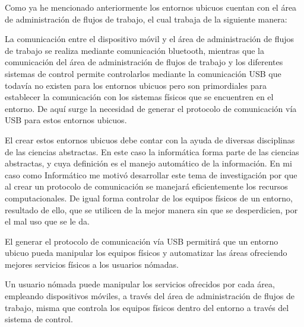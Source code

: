 Como ya he mencionado anteriormente los entornos ubicuos cuentan
con el área de administración de flujos de trabajo, el cual
trabaja de la siguiente manera:\\
\vspace{0.2cm}

La comunicación entre el dispositivo móvil y el área de
administración de flujos de trabajo se realiza mediante
comunicación bluetooth, mientras que la comunicación del área de
administración de flujos de trabajo y los diferentes sistemas de
control permite controlarlos mediante la comunicación USB que
todavía no existen para los entornos ubicuos pero son primordiales
para establecer la comunicación con los sistemas físicos que se
encuentren en el entorno. De aquí surge la necesidad de generar el
protocolo de comunicación vía USB para estos entornos ubicuos.\\

\vspace{0.2cm}

El crear estos entornos ubicuos debe contar con la ayuda de
diversas disciplinas de las ciencias abstractas. En este caso la
informática forma parte de las ciencias abstractas, y cuya
definición es el manejo automático de la información. En mi caso
como Informático me motivó desarrollar este tema de investigación
por que al crear un protocolo de comunicación se manejará
eficientemente los recursos computacionales. De igual forma
controlar de los equipos físicos de un entorno, resultado de ello,
que se utilicen de la mejor manera sin que se desperdicien, por el
mal uso que se le da.\\

\vspace{0.2cm}

El generar el protocolo de comunicación vía USB permitirá que un
entorno ubicuo pueda manipular los equipos físicos y automatizar
las áreas ofreciendo mejores servicios físicos a los usuarios
nómadas.\\

\vspace{0.2cm}

Un usuario nómada puede manipular los servicios ofrecidos por cada
área, empleando dispositivos móviles, a través del área de
administración de flujos de trabajo, misma que controla los
equipos físicos dentro del entorno a través del sistema de
control.\\

\vspace{0.2cm}

